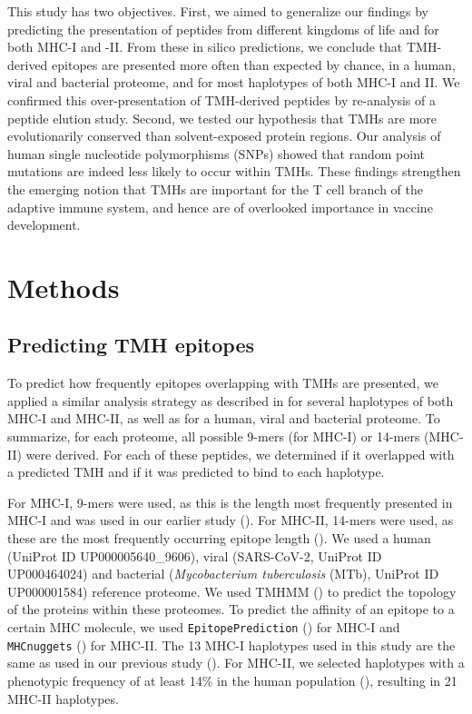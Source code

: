 This study has two objectives. First, we aimed to generalize our findings by predicting the presentation of peptides from different kingdoms of life and for both MHC-I and -II. From these in silico predictions, we conclude that TMH-derived
epitopes are presented more often than expected by chance,
in a human, viral and bacterial proteome, and for most haplotypes of both MHC-I and II. We confirmed this over-presentation of TMH-derived peptides by re-analysis of a peptide elution study. Second, we tested our hypothesis that TMHs
are more evolutionarily conserved than  solvent-exposed protein regions. Our analysis of human
single nucleotide polymorphisms (SNPs) showed that random point mutations are indeed less likely
to occur within TMHs. These findings strengthen the emerging notion that TMHs are important for the T cell branch of the adaptive immune system, and hence are of  
overlooked importance in vaccine development.

\section{Methods}

\subsection{Predicting TMH epitopes}

To predict how frequently epitopes overlapping with TMHs are presented,
we applied a similar analysis strategy as described in \cite{bianchi2017} for several haplotypes of both MHC-I and MHC-II, 
as well as for a human, viral and bacterial proteome.
To summarize, for each proteome, 
all possible 9-mers (for MHC-I) or 14-mers (MHC-II) were derived. 
For each of these peptides, we determined if it overlapped with a predicted 
TMH and if it was predicted to bind to each haplotype.

For MHC-I, 9-mers were used, as this is the length most frequently presented in MHC-I 
and was used in our earlier study (\cite{bianchi2017}). 
For MHC-II, 14-mers were used, 
as these are the most frequently occurring epitope length (\cite{bergseng2015different}).
We used a human (UniProt ID UP000005640\_9606), 
viral (SARS-CoV-2, UniProt ID UP000464024) 
and bacterial (\emph{Mycobacterium tuberculosis} (MTb), UniProt ID UP000001584) 
reference proteome. We used TMHMM (\cite{krogh2001predicting}) to predict the topology 
of the proteins within these proteomes.
To predict the affinity of an epitope to a certain MHC molecule,
we used \verb;EpitopePrediction; (\cite{bianchi2017}) for MHC-I 
and \verb;MHCnuggets; (\cite{shao2020high}) for MHC-II.
The 13 MHC-I haplotypes used in this study are the same as 
used in our previous study (\cite{bianchi2017}).
For MHC-II, we selected haplotypes with a phenotypic frequency 
of at least 14\% in the human population (\cite{greenbaum2011functional}),
resulting in 21 MHC-II haplotypes.

